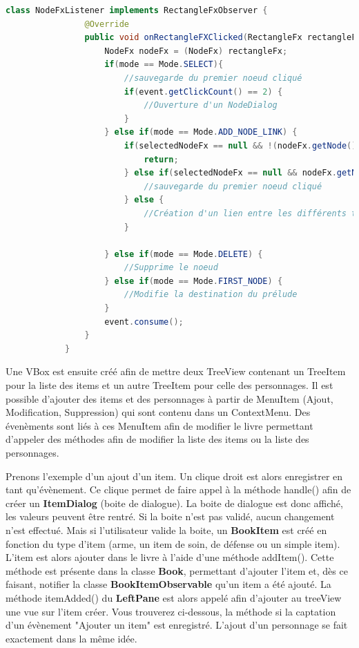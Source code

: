 			\begin{lstlisting}[gobble=12, language=java, caption=Modification Mode]
			class NodeFxListener implements RectangleFxObserver {
				@Override
				public void onRectangleFXClicked(RectangleFx rectangleFx, MouseEvent event) {
					NodeFx nodeFx = (NodeFx) rectangleFx;
					if(mode == Mode.SELECT){
						//sauvegarde du premier noeud cliqué
						if(event.getClickCount() == 2) {
							//Ouverture d'un NodeDialog
						}
					} else if(mode == Mode.ADD_NODE_LINK) {
						if(selectedNodeFx == null && !(nodeFx.getNode() instanceof AbstractBookNodeWithChoices)) {
							return;
						} else if(selectedNodeFx == null && nodeFx.getNode() instanceof AbstractBookNodeWithChoices) {
							//sauvegarde du premier noeud cliqué
						} else {
							//Création d'un lien entre les différents type du premier noeud
						}

					} else if(mode == Mode.DELETE) {
						//Supprime le noeud
					} else if(mode == Mode.FIRST_NODE) {
						//Modifie la destination du prélude
					}
					event.consume();
				}
			}
			\end{lstlisting}


			Une VBox est ensuite créé afin de mettre deux TreeView contenant un TreeItem pour la liste des items et un autre TreeItem pour celle des personnages. Il est possible d'ajouter des items et des personnages à partir de MenuItem (Ajout, Modification, Suppression) qui sont contenu dans un ContextMenu. Des évenèments sont liés à ces MenuItem afin de modifier le livre permettant d'appeler des méthodes afin de modifier la liste des items ou la liste des personnages.

			Prenons l'exemple d'un ajout d'un item. Un clique droit est alors enregistrer en tant qu'évènement. Ce clique permet de faire appel à la méthode handle() afin de créer un \textbf{ItemDialog} (boite de dialogue). La boite de dialogue est donc affiché, les valeurs peuvent être rentré. Si la boite n'est pas validé, aucun changement n'est effectué. Mais si l'utilisateur valide la boite, un \textbf{BookItem} est créé en fonction du type d'item (arme, un item de soin, de défense ou un simple item). L'item est alors ajouter dans le livre à l'aide d'une méthode addItem(). Cette méthode est présente dans la classe \textbf{Book}, permettant d'ajouter l'item et, dès ce faisant, notifier la classe \textbf{BookItemObservable} qu'un item a été ajouté. La méthode itemAdded() du \textbf{LeftPane} est alors appelé afin d'ajouter au treeView une vue sur l'item créer. Vous trouverez ci-dessous, la méthode si la captation d'un évènement "Ajouter un item" est enregistré. L'ajout d'un personnage se fait exactement dans la même idée.

